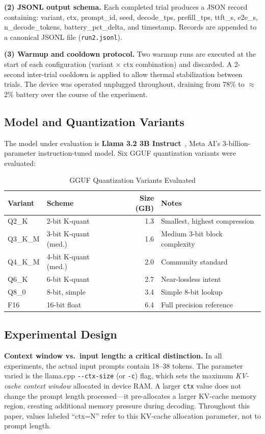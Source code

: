 \documentclass[conference]{IEEEtran}
\begin{document}
\textbf{(2) JSONL output schema.} Each completed trial produces a JSON record
containing: variant, ctx, prompt\_id, seed, decode\_tps, prefill\_tps, ttft\_s,
e2e\_s, n\_decode\_tokens, battery\_pct\_delta, and timestamp. Records are
appended to a canonical JSONL file (\texttt{run2.jsonl}).

\textbf{(3) Warmup and cooldown protocol.} Two warmup runs are executed at the
start of each configuration (variant $\times$ ctx combination) and discarded.
A 2-second inter-trial cooldown is applied to allow thermal stabilization
between trials. The device was operated unplugged throughout, draining from
78\% to ${\approx}$2\% battery over the course of the experiment.

\subsection{Model and Quantization Variants}

The model under evaluation is \textbf{Llama 3.2 3B Instruct}~\cite{llama32},
Meta AI's 3-billion-parameter instruction-tuned model. Six GGUF quantization
variants were evaluated:

\begin{table}[h]
\centering
\caption{GGUF Quantization Variants Evaluated}
\label{tab:variants}
\begin{tabular}{llrl}
\toprule
\textbf{Variant} & \textbf{Scheme} & \textbf{Size (GB)} & \textbf{Notes} \\
\midrule
Q2\_K   & 2-bit K-quant         & 1.3 & Smallest, highest compression \\
Q3\_K\_M & 3-bit K-quant (med.) & 1.6 & Medium 3-bit block complexity \\
Q4\_K\_M & 4-bit K-quant (med.) & 2.0 & Community standard \\
Q6\_K   & 6-bit K-quant         & 2.7 & Near-lossless intent \\
Q8\_0   & 8-bit, simple         & 3.4 & Simple 8-bit lookup \\
F16     & 16-bit float          & 6.4 & Full precision reference \\
\bottomrule
\end{tabular}
\end{table}

\subsection{Experimental Design}

\textbf{Context window vs.\ input length: a critical distinction.}
In all experiments, the actual input prompts contain 18--38 tokens.
The parameter varied is the llama.cpp \texttt{-{}-ctx-size} (or \texttt{-c})
flag, which sets the maximum \emph{KV-cache context window} allocated in
device RAM. A larger \texttt{ctx} value does not change the prompt length
processed---it pre-allocates a larger KV-cache memory region, creating
additional memory pressure during decoding. Throughout this paper, values
labeled ``ctx=N'' refer to this KV-cache allocation parameter, not to
prompt length.
\end{document}
